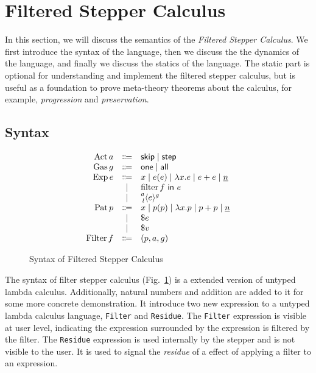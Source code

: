 \section{Filtered Stepper Calculus}

In this section, we will discuss the semantics of the \emph{Filtered Stepper
Calculus}. We first introduce the syntax of the language, then we discuss the
the dynamics of the language, and finally we discuss the statics of the
language. The static part is optional for understanding and implement the filtered
stepper calculus, but is useful as a foundation to prove meta-theory theorems
about the calculus, for example, \emph{progression} and \emph{preservation}.


\subsection{Syntax}

\begin{figure}[h]
  \begin{equation*}
    \begin{array}{rcl}
      \DefAct a    &\Coloneqq& \ActSkip \mid \ActStep \\
      \DefGas g    &\Coloneqq& \GasOne \mid \GasAll \\
      \DefExp e    &\Coloneqq& x \mid e(e) \mid \Lam{x}{e} \mid e + e \mid \Nat{n} \\
                   &\mid     & \Filter{f}{e} \\
                   &\mid     & \Residue{a}{g}{l}{e} \\
      \DefPat p    &\Coloneqq& x \mid p(p) \mid \Lam{x}{p} \mid p + p \mid \Nat{n} \\
                   &\mid     & \$e \\
                   &\mid     & \$v \\
      \DefFilter f &\Coloneqq& (p, a, g) \\
    \end{array}
  \end{equation*}
  \caption{Syntax of Filtered Stepper Calculus}
  \label{fig:filter-syntax}
\end{figure}


The syntax of filter stepper calculus (Fig.~\ref{fig:filter-syntax}) is a
extended version of untyped lambda calculus. Additionally, natural numbers and
addition are added to it for some more concrete demonstration. It introduce two
new expression to a untyped lambda calculus language, \texttt{Filter} and
\texttt{Residue}. The \texttt{Filter} expression is visible at user level,
indicating the expression surrounded by the expression is filtered by the
filter. The \texttt{Residue} expression is used internally by the stepper and is
not visible to the user. It is used to signal the \emph{residue} of a effect of
applying a filter to an expression.

